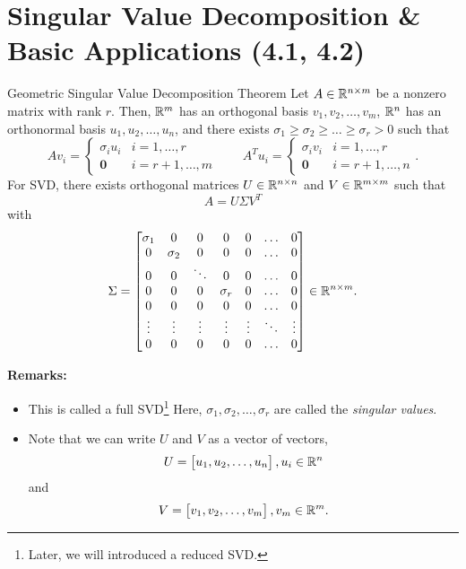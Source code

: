 \documentclass[letterpaper]{article}
\newcommand{\0}{\mathbf{0}}
\begin{document}
\section{Singular Value Decomposition \& Basic Applications (4.1, 4.2)}
\begin{theorem}{Geometric Singular Value Decomposition Theorem}{}
    Let $A \in \mathbb{R}^{n \times m}$ be a nonzero matrix with rank $r$. Then, $\mathbb{R}^m$ has an orthogonal basis $v_1, v_2, \hdots, v_m$, $\mathbb{R}^n$ has an orthonormal basis $u_1, u_2, \hdots, u_n$, and there exists $\sigma_1 \geq \sigma_2 \geq \hdots \geq \sigma_r > 0$ such that 
    \[Av_i = \begin{cases}
        \sigma_i u_i & i = 1, \hdots, r \\ 
        \0 & i = r + 1, \hdots, m
    \end{cases} \qquad A^T u_i = \begin{cases}
        \sigma_i v_i & i = 1, \hdots, r \\ 
        \0 & i = r + 1, \hdots, n
    \end{cases}.\]
    For SVD, there exists orthogonal matrices $U \in \mathbb{R}^{n \times n}$ and $V \in \mathbb{R}^{m \times m}$ such that \[A = U \Sigma V^T\] with \[\Sigma = \begin{bmatrix}
        \sigma_1 & 0 & 0 & 0 & 0 & \hdots & 0 \\ 
        0 & \sigma_2 & 0 & 0 & 0 & \hdots & 0 \\ 
        0 & 0 & \ddots & 0 & 0 & \hdots & 0 \\ 
        0 & 0 & 0 & \sigma_r & 0 & \hdots & 0 \\ 
        0 & 0 & 0 & 0 & 0 & \hdots & 0 \\ 
        \vdots & \vdots & \vdots & \vdots & \vdots & \ddots & \vdots \\ 
        0 & 0 & 0 & 0 & 0 & \hdots & 0
    \end{bmatrix} \in \mathbb{R}^{n \times m}.\]
\end{theorem}
\textbf{Remarks:}
\begin{itemize}
    \item This is called a full SVD\footnote{Later, we will introduced a reduced SVD.} Here, $\sigma_1, \sigma_2, \hdots, \sigma_r$ are called the \emph{singular values}.
    \item Note that we can write $U$ and $V$ as a vector of vectors, 
    \[U = \begin{bmatrix}
        u_1, u_2, \hdots, u_n
    \end{bmatrix}, u_i \in \mathbb{R}^{n}\]
    and \[V = \begin{bmatrix}
        v_1, v_2, \hdots, v_m
    \end{bmatrix}, v_m \in \mathbb{R}^m.\]
\end{itemize}
\end{document}
